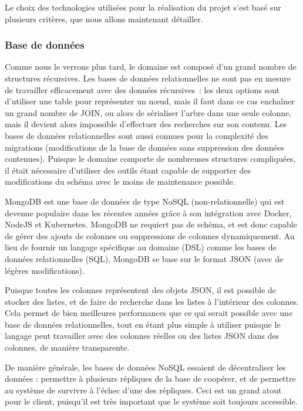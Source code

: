 \documentclass[11pt,french]{memoir}
\begin{document}
	Le choix des technologies utilisées pour la réalisation du projet s’est basé sur plusieurs critères, que nous allons maintenant détailler.

	\subsubsection{Base de données}

	Comme nous le verrons plus tard, le domaine est composé d’un grand nombre de structures récursives.
	Les bases de données relationnelles ne sont pas en mesure de travailler efficacement avec des données récursives~: les deux options sont d’utiliser une table pour représenter un nœud, mais il faut dans ce cas enchaîner un grand nombre de JOIN, ou alors de sérialiser l’arbre dans une seule colonne, mais il devient alors impossible d’effectuer des recherches sur son contenu.
	Les bases de données relationnelles sont aussi connues pour la complexité des migrations (modifications de la base de données sans suppression des données contenues).
	Puisque le domaine comporte de nombreuses structures compliquées, il était nécessaire d’utiliser des outils étant capable de supporter des modifications du schéma avec le moins de maintenance possible.

	\uparagraph
	MongoDB est une base de données de type NoSQL (non-relationnelle) qui est devenue populaire dans les récentes années grâce à son intégration avec Docker, NodeJS et Kubernetes.
	MongoDB ne requiert pas de schéma, et est donc capable de gérer des ajouts de colonnes ou suppressions de colonnes dynamiquement.
	Au lieu de fournir un langage spécifique au domaine (DSL) comme les bases de données relationnelles (SQL), MongoDB se base sur le format JSON (avec de légères modifications).

	Puisque toutes les colonnes représentent des objets JSON, il est possible de stocker des listes, et de faire de recherche dans les listes à l’intérieur des colonnes.
	Cela permet de bien meilleures performances que ce qui serait possible avec une base de données relationnelles, tout en étant plus simple à utiliser puisque le langage peut travailler avec des colonnes réelles ou des listes JSON dans des colonnes, de manière transparente.

	De manière générale, les bases de données NoSQL essaient de décentraliser les données : permettre à plusieurs répliques de la base de coopérer, et de permettre au système de survivre à l’échec d’une des répliques.
	Ceci est un grand atout pour le client, puisqu’il est très important que le système soit toujours accessible.
\end{document}
